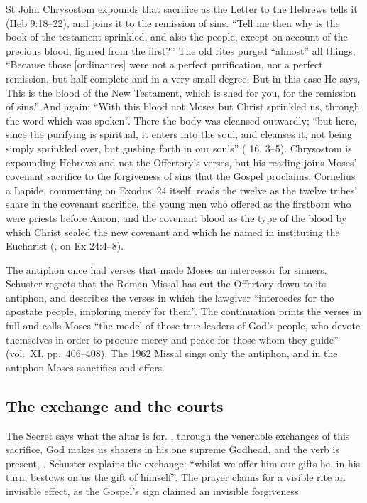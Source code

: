 St John Chrysostom expounds that sacrifice as the Letter to the Hebrews tells
it (Heb 9:18--22), and joins it to the remission of sins. ``Tell me then why is
the book of the testament sprinkled, and also the people, except on account of
the precious blood, figured from the first?'' The old rites purged ``almost''
all things, ``Because those [ordinances] were not a perfect purification, nor a
perfect remission, but half-complete and in a very small degree. But in this
case He says, This is the blood of the New Testament, which is shed for you,
for the remission of sins.'' And again: ``With this blood not Moses but Christ
sprinkled us, through the word which was spoken''. There the body was cleansed
outwardly; ``but here, since the purifying is spiritual, it enters into the
soul, and cleanses it, not being simply sprinkled over, but gushing forth in our
souls'' ( 16, 3--5). Chrysostom is expounding Hebrews
and not the Offertory's verses, but his reading joins Moses' covenant sacrifice
to the forgiveness of sins that the Gospel proclaims. Cornelius a Lapide,
commenting on Exodus~24 itself, reads the twelve  as the twelve
tribes' share in the covenant sacrifice, the young men who offered as the
firstborn who were priests before Aaron, and the covenant blood as the type of
the blood by which Christ sealed the new covenant and which he named in
instituting the Eucharist (, on Ex
24:4--8).

The antiphon once had verses that made Moses an intercessor for sinners.
Schuster regrets that the Roman Missal has cut the Offertory down to its
antiphon, and describes the verses in which the lawgiver ``intercedes for the
apostate people, imploring mercy for them''. The continuation prints the
verses in full and calls Moses ``the model of those true leaders of God's
people, who devote themselves in order to procure mercy and peace for those
whom they guide'' (vol.~XI, pp.~406--408). The 1962 Missal sings only the
antiphon, and in the antiphon Moses sanctifies and offers.

\subsection{The exchange and the courts}

The Secret says what the altar is for. , through the venerable exchanges of this sacrifice, God makes us
sharers in his one supreme Godhead, and the verb is present, .
Schuster explains the exchange: ``whilst we offer him our gifts he, in his
turn, bestows on us the gift of himself''. The prayer claims for a visible rite
an invisible effect, as the Gospel's sign claimed an invisible forgiveness.

